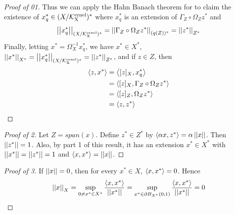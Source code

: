 \begin{thm}
\begin{proof}[Proof of 01]
    Thus we can apply the Hahn Banach theorem for \NormedSpaces to claim 
    the existence of $x_q^* \in (X/\bf\mathcal{K}\rm^{ernel}_X)^*$ where
    $x_q^*$ is an extension of $\Gamma_Z \circ \Omega_Z z^*$ and
    \begin{equation}
        \left|\left| x_q^* \right|\right|_{(X/\bf\mathcal{K}\rm^{ernel}_X)^*} = \left|\left| \Gamma_Z \circ \Omega_Z z^* \right|\right|_{(q(Z))^*} = \left|\left| z^* \right|\right|_{Z^*}
    \end{equation}
    Finally, letting $x^* = \Omega_X^{-1} x_q^*$, we have 
    $x^* \in X^*$, 
    $\left|\left| x^* \right|\right|_{X^*} = \left|\left| x_q^* \right|\right|_{(X/\bf\mathcal{K}\rm^{ernel}_X)^*} =\left|\left| z^* \right|\right|_{Z^*}$, 
    and 
    if $z \in Z$, then 
    \begin{align*}
        \left\langle z, x^* \right\rangle & = \left\langle [z]_X, x_q^* \right\rangle \\
        & = \left\langle [z]_X, \Gamma_Z \circ \Omega_Zz^* \right\rangle\\
        & = \left\langle [z]_Z, \Omega_Z z^* \right\rangle\\
        & = \left\langle z, z^* \right\rangle
    \end{align*}
\end{proof}

\begin{proof}[Proof of 2]
    Let $Z=span(x)$. 
    Define $z^* \in Z^*$ by 
    $\left\langle \alpha x, z^* \right\rangle = \alpha \left|\left| x \right|\right|$. 
    Then $\left|\left| z^* \right|\right| = 1$. 
    Also, by part 1 of this result, 
    it has an extension $x^* \in X^*$ with 
    $\left|\left| x^* \right|\right| = \left|\left| z^* \right|\right| =1$ 
    and $\left\langle x,x^* \right\rangle = \left|\left| x \right|\right|$. 
\end{proof}
\begin{proof}[Proof of 3]
    If $\left|\left| x \right|\right| = 0$, then
    for every $x^* \in X$, $\left\langle x,x^* \right\rangle = 0$.
    Hence 
    \begin{equation} 
    \left|\left| x \right|\right|_X = \sup\limits_{0 \neq x^* \in X^*} \frac{\left\langle x,x^* \right\rangle}{\left|\left| x^* \right|\right|} = \sup\limits_{x^* \in \partial B_{X^*}(0;1)} \frac{\left\langle x,x^* \right\rangle}{\left|\left| x^* \right|\right|}=0
    \end{equation}


\end{proof}
\end{thm}
